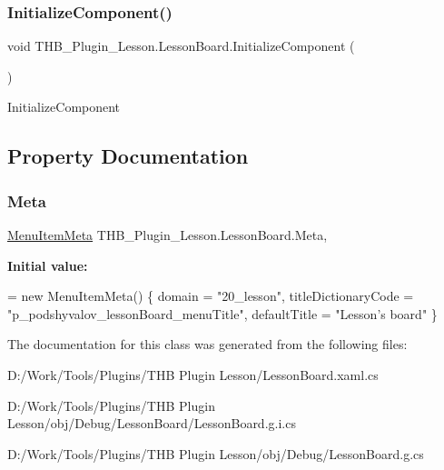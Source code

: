 \subsubsection{\texorpdfstring{Initialize\+Component()}{InitializeComponent()}\hspace{0.1cm}{\footnotesize\ttfamily [5/5]}}
{\footnotesize\ttfamily void T\+H\+B\+\_\+\+Plugin\+\_\+\+Lesson.\+Lesson\+Board.\+Initialize\+Component (\begin{DoxyParamCaption}{ }\end{DoxyParamCaption})}



Initialize\+Component 



\subsection{Property Documentation}
\mbox{\label{class_t_h_b___plugin___lesson_1_1_lesson_board_a8e0dbfdf59e44583f46bcd3728288e19}} 
\subsubsection{\texorpdfstring{Meta}{Meta}}
{\footnotesize\ttfamily \mbox{\hyperlink{class_uniform_client_1_1_plugins_1_1_menu_item_meta}{Menu\+Item\+Meta}} T\+H\+B\+\_\+\+Plugin\+\_\+\+Lesson.\+Lesson\+Board.\+Meta\hspace{0.3cm}{\ttfamily [get]}, {\ttfamily [set]}}

{\bfseries Initial value\+:}
\begin{DoxyCode}
= \textcolor{keyword}{new} MenuItemMeta()
        \{
            domain = \textcolor{stringliteral}{"20\_lesson"},
            titleDictionaryCode = \textcolor{stringliteral}{"p\_podshyvalov\_lessonBoard\_menuTitle"},
            defaultTitle = \textcolor{stringliteral}{"Lesson's board"}
        \}
\end{DoxyCode}


The documentation for this class was generated from the following files\+:\begin{DoxyCompactItemize}
\item 
D\+:/\+Work/\+Tools/\+Plugins/\+T\+H\+B Plugin Lesson/Lesson\+Board.\+xaml.\+cs\item 
D\+:/\+Work/\+Tools/\+Plugins/\+T\+H\+B Plugin Lesson/obj/\+Debug/\+Lesson\+Board/Lesson\+Board.\+g.\+i.\+cs\item 
D\+:/\+Work/\+Tools/\+Plugins/\+T\+H\+B Plugin Lesson/obj/\+Debug/Lesson\+Board.\+g.\+cs\end{DoxyCompactItemize}
